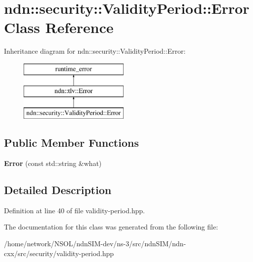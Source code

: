 \hypertarget{classndn_1_1security_1_1ValidityPeriod_1_1Error}{}\section{ndn\+:\+:security\+:\+:Validity\+Period\+:\+:Error Class Reference}
\label{classndn_1_1security_1_1ValidityPeriod_1_1Error}
Inheritance diagram for ndn\+:\+:security\+:\+:Validity\+Period\+:\+:Error\+:\begin{figure}[H]
\begin{center}
\leavevmode
\includegraphics[height=3.000000cm]{classndn_1_1security_1_1ValidityPeriod_1_1Error}
\end{center}
\end{figure}
\subsection*{Public Member Functions}
\begin{DoxyCompactItemize}
\item 
{\bfseries Error} (const std\+::string \&what)\hypertarget{classndn_1_1security_1_1ValidityPeriod_1_1Error_a7607c85b31b2489a6fc2f4f1ca5f26a3}{}\label{classndn_1_1security_1_1ValidityPeriod_1_1Error_a7607c85b31b2489a6fc2f4f1ca5f26a3}

\end{DoxyCompactItemize}


\subsection{Detailed Description}


Definition at line 40 of file validity-\/period.\+hpp.



The documentation for this class was generated from the following file\+:\begin{DoxyCompactItemize}
\item 
/home/network/\+N\+S\+O\+L/ndn\+S\+I\+M-\/dev/ns-\/3/src/ndn\+S\+I\+M/ndn-\/cxx/src/security/validity-\/period.\+hpp\end{DoxyCompactItemize}
